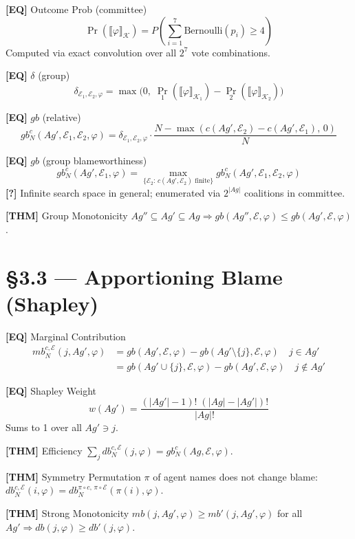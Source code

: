 \documentclass[10pt,a4paper]{article}
\newcommand{\EQ}[1]{\textcolor{eqcol}{\textbf{[EQ]}}\; #1}
\newcommand{\THM}[1]{\textcolor{thmcol}{\textbf{[THM]}}\; #1}
\newcommand{\AMB}[1]{\textcolor{ambcol}{\textbf{[?]}\; #1}}
\begin{document}
\EQ{Outcome Prob (committee)}
$$\Pr(\llbracket\varphi\rrbracket_\mathcal{K}) = P\!\left(\sum_{i=1}^{7} \mathrm{Bernoulli}(p_i) \geq 4\right)$$
Computed via exact convolution over all $2^7$ vote combinations.

\EQ{$\delta$ (group)}
$$\delta_{\mathcal{E}_1,\mathcal{E}_2,\varphi} = \max\!\bigl(0,\; \Pr_1(\llbracket\varphi\rrbracket_{\mathcal{K}_1}) - \Pr_2(\llbracket\varphi\rrbracket_{\mathcal{K}_2})\bigr)$$

\EQ{$gb$ (relative)}
$$gb^c_N(Ag',\mathcal{E}_1,\mathcal{E}_2,\varphi) = \delta_{\mathcal{E}_1,\mathcal{E}_2,\varphi} \cdot \frac{N - \max(c(Ag',\mathcal{E}_2)-c(Ag',\mathcal{E}_1),\,0)}{N}$$

\EQ{$gb$ (group blameworthiness)}
$$gb^c_N(Ag',\mathcal{E}_1,\varphi) = \max_{\{\mathcal{E}_2:\, c(Ag',\mathcal{E}_2)\text{ finite}\}} gb^c_N(Ag',\mathcal{E}_1,\mathcal{E}_2,\varphi)$$
\AMB{Infinite search space in general; enumerated via $2^{|Ag|}$ coalitions in committee.}

\THM{Group Monotonicity} $Ag'' \subseteq Ag' \subseteq Ag \Rightarrow gb(Ag'',\mathcal{E},\varphi) \leq gb(Ag',\mathcal{E},\varphi)$.

\section*{\S3.3 — Apportioning Blame (Shapley)}

\EQ{Marginal Contribution}
\begin{align*}
mb^{c,\mathcal{E}}_N(j,Ag',\varphi) &= gb(Ag',\mathcal{E},\varphi) - gb(Ag'{\setminus}\{j\},\mathcal{E},\varphi) \quad j \in Ag'\\
&= gb(Ag'{\cup}\{j\},\mathcal{E},\varphi) - gb(Ag',\mathcal{E},\varphi) \quad j \notin Ag'
\end{align*}

\EQ{Shapley Weight}
$$w(Ag') = \frac{(|Ag'|-1)!\;(|Ag|-|Ag'|)!}{|Ag|!}$$
Sums to 1 over all $Ag' \ni j$.

\THM{Efficiency} $\displaystyle\sum_j db^{c,\mathcal{E}}_N(j,\varphi) = gb^c_N(Ag,\mathcal{E},\varphi)$.

\THM{Symmetry} Permutation $\pi$ of agent names does not change blame: $db^{c,\mathcal{E}}_N(i,\varphi) = db^{\pi\circ c,\,\pi\circ\mathcal{E}}_N(\pi(i),\varphi)$.

\THM{Strong Monotonicity} $mb(j,Ag',\varphi) \geq mb'(j,Ag',\varphi)$ for all $Ag' \Rightarrow db(j,\varphi) \geq db'(j,\varphi)$.
\end{document}
